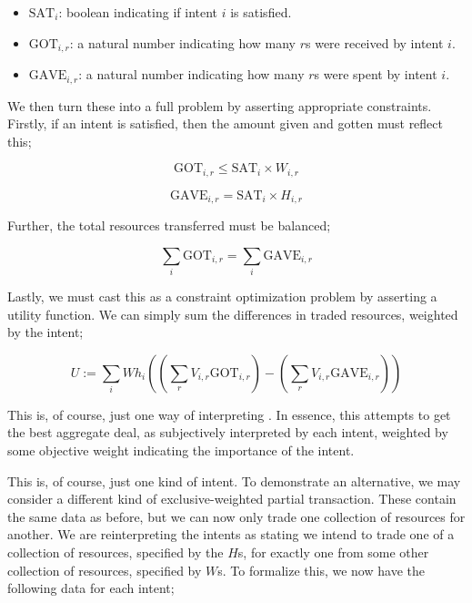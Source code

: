 \begin{itemize}
    \item $\text{SAT}_i$:  boolean indicating if intent $i$ is satisfied.
    \item $\text{GOT}_{i, r}$: a natural number indicating how many $r$s were received by intent $i$.
    \item $\text{GAVE}_{i, r}$: a natural number indicating how many $r$s were spent by intent $i$.
\end{itemize}

We then turn these into a full problem by asserting appropriate constraints. Firstly, if an intent is satisfied, then the amount given and gotten must reflect this;

\begin{equation}
    \text{GOT}_{i, r} \leq \text{SAT}_i \times W_{i, r}
\end{equation}

\begin{equation}
    \text{GAVE}_{i, r} = \text{SAT}_i \times H_{i, r}
\end{equation}

Further, the total resources transferred must be balanced;

\begin{equation}
    \sum_{i} \text{GOT}_{i, r} = \sum_{i} \text{GAVE}_{i, r}
\end{equation}

Lastly, we must cast this as a constraint optimization problem by asserting a utility function. We can simply sum the differences in traded resources, weighted by the intent;

\begin{equation}
    U := \sum_i Wh_i \left(\left(\sum_r V_{i, r} \text{GOT}_{i, r}\right) - \left(\sum_r V_{i, r} \text{GAVE}_{i, r}\right)\right)
\end{equation}

This is, of course, just one way of interpreting . In essence, this attempts to get the best aggregate deal, as subjectively interpreted by each intent, weighted by some objective weight indicating the importance of the intent.

This is, of course, just one kind of intent. To demonstrate an alternative, we may consider a different kind of exclusive-weighted partial transaction. These contain the same data as before, but we can now only trade one collection of resources for another. We are reinterpreting the intents as stating we intend to trade one of a collection of resources, specified by the $H$s, for exactly one from some other collection of resources, specified by $W$s. To formalize this, we now have the following data for each intent;

